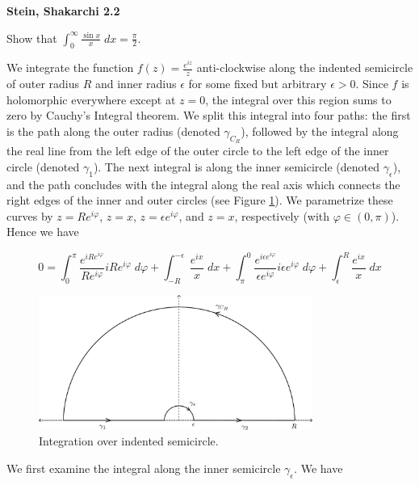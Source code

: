 \textbf{Stein, Shakarchi 2.2}

Show that $ \int_{0}^{\infty}{\frac{\sin x}{x} \; dx} = \frac{\pi}{2}.$

\begin{solution}
    We integrate the function $f(z) = \frac{e^{iz}}{z}$ anti-clockwise along the indented semicircle of outer radius 
    $R$ and inner radius $\epsilon$ for some fixed but arbitrary $\epsilon > 0$. Since $f$ is holomorphic everywhere 
    except at $z = 0$, the integral over this region sums to zero by Cauchy's Integral theorem. We split this integral 
    into four paths: the first is the path along the outer radius (denoted $\gamma_{C_R}$), followed by the integral 
    along the real line from the left edge of the outer circle to the left edge of the inner circle (denoted 
    $\gamma_1$). The next integral is along the inner semicircle (denoted $\gamma_{\epsilon}$), and the path concludes 
    with the integral along the real axis which connects the right edges of the inner and outer circles (see Figure 
    \ref{fig:problem_2}). We parametrize these curves by $z = Re^{i \varphi}$, $z = x$, $z = \epsilon e^{i \varphi}$, 
    and $z = x$, respectively (with $\varphi \in (0, \pi)$). Hence we have

    $$
    0 = \int_{0}^{\pi} {\frac{e^{i R e^{i \varphi}}}{R e^{i \varphi}} i R e^{i \varphi} \; d\varphi }  
      + \int_{-R}^{-\epsilon} {\frac{e^{ix}}{x} \; dx}
      + \int_{\pi}^{0} {\frac{e^{i \epsilon e^{i \varphi}}}{\epsilon e^{i \varphi}} i \epsilon e^{i \varphi} \; d\varphi }  
      + \int_{\epsilon}^{R} {\frac{e^{ix}}{x} \; dx}
    $$

    \begin{figure}[h]
        \centering
        \includegraphics*[width=0.8\textwidth]{problem_2.png}
        \caption{Integration over indented semicircle.}
        \label{fig:problem_2}
    \end{figure}

    We first examine the integral along the inner semicircle $\gamma_{\epsilon}$. We have


\end{solution}
